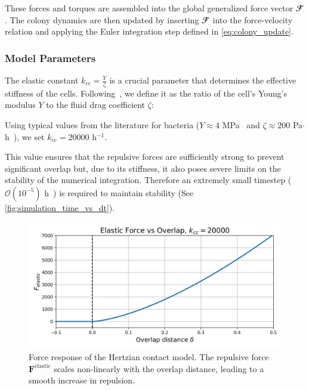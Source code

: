 \documentclass[conference]{IEEEtran}
\begin{document}
These forces and torques are assembled into the global generalized force vector $\mathbfcal{F}$. The colony dynamics are then updated by inserting $\mathbfcal{F}$ into the force-velocity relation and applying the Euler integration step defined in \autoref{eq:colony_update}.

\subsubsection{Model Parameters}

The elastic constant $k_{cc} = \frac{Y}{\zeta}$ is a crucial parameter that determines the effective stiffness of the cells. Following~\cite{You2018}, we define it as the ratio of the cell's Young's modulus $Y$ to the fluid drag coefficient $\zeta$:

Using typical values from the literature for bacteria ($Y \approx 4$ MPa~\cite{You2018, Blanchard2015} and $\zeta \approx 200$ Pa$\cdot$h~\cite{You2018}), we set $k_{cc} = 20000$ h$^{-1}$.


This value ensures that the repulsive forces are sufficiently strong to prevent significant overlap but, due to its stiffness, it also poses severe limits on the stability of the numerical integration\cite{Yan2022}. Therefore an extremely small timestep ($\mathcal{O}(10^{-5})$ h~\cite{Khan_2024, You2018, Blanchard2015}) is required to maintain stability (See \autoref{fig:simulation_time_vs_dt}).

\begin{figure}[H]
    \centering
    \includegraphics[width=\linewidth]{figures/hertzian_contact_model.png}
    \caption{Force response of the Hertzian contact model. The repulsive force $\mathbf{F}^{\text{elastic}}$ scales non-linearly with the overlap distance, leading to a smooth increase in repulsion.}
    \label{fig:hertzian_contact_model}
\end{figure}
\end{document}
